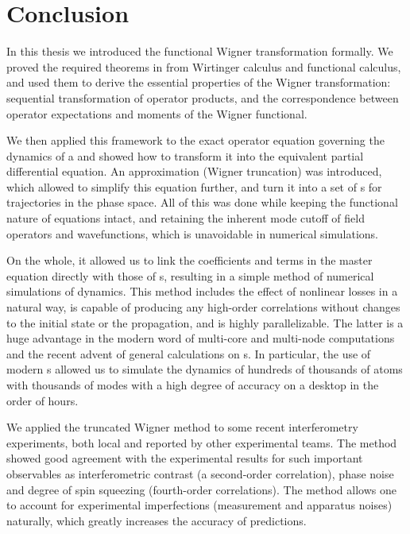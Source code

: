 \chapter{Conclusion}
\label{cha:conclusion}

In this thesis we introduced the functional Wigner transformation formally.
We proved the required theorems in from Wirtinger calculus and functional calculus, and used them to derive the essential properties of the Wigner transformation: sequential transformation of operator products, and the correspondence between operator expectations and moments of the Wigner functional.

We then applied this framework to the exact operator equation governing the dynamics of a  and showed how to transform it into the equivalent partial differential equation.
An approximation (Wigner truncation) was introduced, which allowed to simplify this equation further, and turn it into a set of s for trajectories in the phase space.
All of this was done while keeping the functional nature of equations intact, and retaining the inherent mode cutoff of field operators and wavefunctions, which is unavoidable in numerical simulations.

On the whole, it allowed us to link the coefficients and terms in the master equation directly with those of s, resulting in a simple method of numerical simulations of  dynamics.
This method includes the effect of nonlinear losses in a natural way, is capable of producing any high-order correlations without changes to the initial state or the propagation, and is highly parallelizable.
The latter is a huge advantage in the modern word of multi-core and multi-node computations and the recent advent of general calculations on s.
In particular, the use of modern s allowed us to simulate the dynamics of hundreds of thousands of atoms with thousands of modes with a high degree of accuracy on a desktop in the order of hours.

We applied the truncated Wigner method to some recent  interferometry experiments, both local and reported by other experimental teams.
The method showed good agreement with the experimental results for such important observables as interferometric contrast (a second-order correlation), phase noise and degree of spin squeezing (fourth-order correlations).
The method allows one to account for experimental imperfections (measurement and apparatus noises) naturally, which greatly increases the accuracy of predictions.

